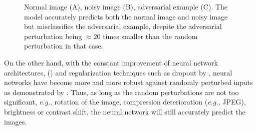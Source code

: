 \begin{figure}[ht]
      

    \caption{ Normal image (A), noisy image (B), adversarial example (C). The
        model accurately predicts both the normal image and noisy image but
        misclassifies the adversarial example, despite the adversarial
        perturbation being $\approx{20}$ times smaller than the random
        perturbation in that case. }
    \label{fig:noise}
\end{figure}

On the other hand, with the constant improvement of neural network
architectures, (\cite{he_deep_2015,vaswani_attention_2017,huang_densely_2018})
and regularization techniques such as dropout by \cite{srivastava_dropout_2014},
neural networks have become more and more robust against randomly perturbed
inputs as demonstrated by \cite{hendrycks_benchmarking_2019}. Thus, as long as
the random perturbations are not too significant, \emph{e.g.}, rotation of the
image, compression deterioration (\emph{e.g.}, JPEG), brightness or contrast
shift, the neural network will still accurately predict the images.


